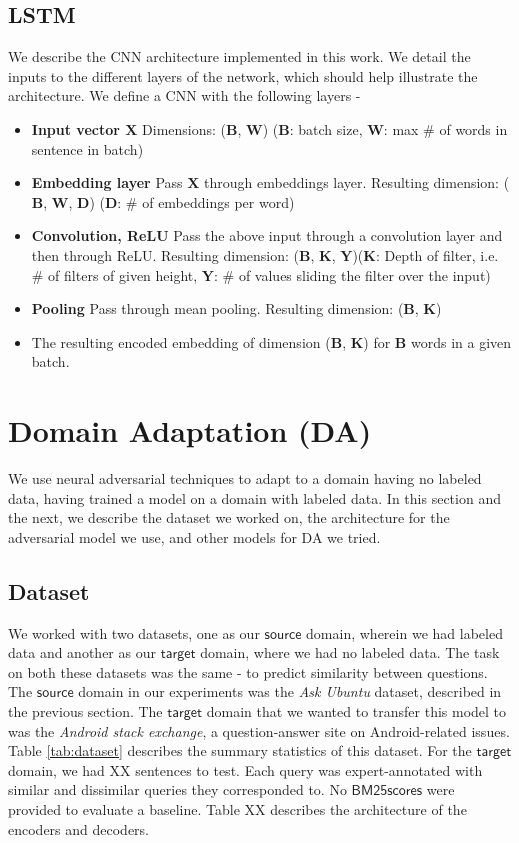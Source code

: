 \documentclass{sigkddExp}
\begin{document}
\subsection{LSTM}
We describe the CNN architecture implemented in this work. We detail the inputs to the different layers of the network, which should help illustrate the architecture.
We define a CNN with the following layers -
\begin{itemize}[topsep=0pt,itemsep=-1ex,partopsep=1ex,parsep=1ex]
\item \textbf{Input vector $\mathbf{X}$} Dimensions: ($\mathbf{B}$, $\mathbf{W}$) ($\mathbf{B}$: batch size, $\mathbf{W}$: max \# of words in sentence in batch)
\item \textbf{Embedding layer} Pass $\mathbf{X}$ through embeddings layer. Resulting dimension: ($\mathbf{B}$, $\mathbf{W}$, $\mathbf{D}$) ($\mathbf{D}$: \# of embeddings per word)
\item \textbf{Convolution, ReLU} Pass the above input through a convolution layer and then through ReLU. Resulting dimension: ($\mathbf{B}$, $\mathbf{K}$, $\mathbf{Y}$)($\mathbf{K}$: Depth of filter, i.e. \# of filters of given height, $\mathbf{Y}$: \# of values sliding the filter over the input)
\item \textbf{Pooling} Pass through mean pooling. Resulting dimension: ($\mathbf{B}$, $\mathbf{K}$)
\item The resulting encoded embedding of dimension ($\mathbf{B}$, $\mathbf{K}$) for $\mathbf{B}$ words in a given batch.
\end{itemize}

\section{Domain Adaptation (DA)}
\label{domain_adapt}
We use neural adversarial techniques\cite{ganin2015unsupervised} to adapt to a domain having no labeled data, having trained a model on a domain with labeled data. In this section and the next, we describe the dataset we worked on, the architecture for the adversarial model we use, and other models for DA we tried.


\subsection{Dataset}
We worked with two datasets, one as our $\mathsf{source}$ domain, wherein we had labeled data and another as our $\mathsf{target}$ domain, where we had no labeled data. The task on both these datasets was the same - to predict similarity between questions. The $\mathsf{source}$ domain in our experiments was the \textit{Ask Ubuntu} dataset, described in the previous section. The $\mathsf{target}$ domain that we wanted to transfer this model to was the \textit{Android stack exchange}, a question-answer site on Android-related issues. Table \ref{tab:dataset} describes the summary statistics of this dataset. For the $\mathsf{target}$ domain, we had XX sentences to test. Each query was expert-annotated with similar and dissimilar queries they corresponded to. No $\mathsf{BM25 scores}$ were provided to evaluate a baseline. Table XX describes the architecture of the encoders and decoders.
\end{document}
